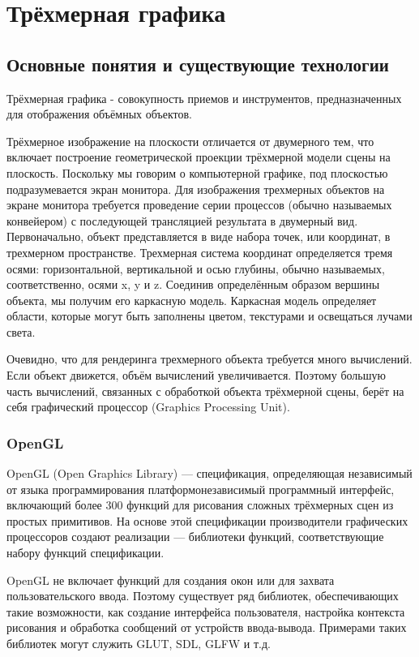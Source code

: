 \chapter{Трёхмерная графика}
\section{Основные понятия и существующие технологии}
Трёхмерная графика - совокупность приемов и инструментов, предназначенных для отображения объёмных объектов.


Трёхмерное изображение на плоскости отличается от двумерного тем, что включает построение 
геометрической проекции трёхмерной модели сцены на плоскость. Поскольку мы говорим 
о компьютерной графике, под плоскостью подразумевается экран монитора.
Для изображения трехмерных объектов на экране монитора требуется проведение серии процессов 
(обычно называемых конвейером) с последующей трансляцией результата в двумерный вид. 
Первоначально, объект представляется в виде набора точек, или координат, в трехмерном пространстве. 
Трехмерная система координат определяется тремя осями: горизонтальной, вертикальной и осью глубины, 
обычно называемых, соответственно, осями x, y и z. Соединив определённым образом вершины объекта, 
мы получим его каркасную модель. Каркасная модель определяет области, 
которые могут быть заполнены цветом, текстурами и освещаться лучами света.


Очевидно, что для рендеринга трехмерного объекта требуется много вычислений. Если объект движется, 
объём вычислений увеличивается. Поэтому большую часть вычислений, связанных 
с обработкой объекта трёхмерной сцены, берёт на себя графический процессор (Graphics Processing Unit).



\subsection{OpenGL}
OpenGL (Open Graphics Library) ---  спецификация, определяющая независимый от языка программирования 
платформонезависимый программный интерфейс, включающий более 300 функций для рисования сложных 
трёхмерных сцен из простых примитивов. На основе этой спецификации производители графических процессоров
создают реализации --- библиотеки функций, соответствующие набору функций спецификации.

OpenGL не включает функций для создания окон или для захвата пользовательского ввода. Поэтому существует 
ряд библиотек, обеспечивающих такие возможности, как создание интерфейса пользователя, настройка контекста 
рисования и обработка сообщений от устройств ввода-вывода.  Примерами таких библиотек могут служить GLUT, SDL, GLFW и т.д.


